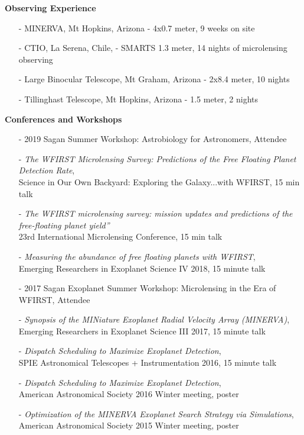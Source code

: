 \documentclass{article}
\begin{document}
{\large{\bf Observing Experience}}
\begin{itemize}
\item[-] MINERVA, Mt Hopkins, Arizona - 4x0.7 meter, 9 weeks on site
\item[-] CTIO, La Serena, Chile, - SMARTS 1.3 meter, 14 nights of microlensing observing
\item[-] Large Binocular Telescope, Mt Graham, Arizona - 2x8.4 meter, 10 nights
\item[-] Tillinghast Telescope, Mt Hopkins, Arizona - 1.5 meter, 2 nights 
\end{itemize}





{\large{\bf Conferences and Workshops}}
\begin{itemize}
\item[-] 2019 Sagan Summer Workshop: Astrobiology for Astronomers, Attendee
\item[-] \textit{ The WFIRST Microlensing Survey: Predictions of the Free Floating Planet Detection Rate},\\ Science in Our Own Backyard: Exploring the Galaxy...with WFIRST, 15 min talk
\item[-] \textit{The WFIRST microlensing survey: mission updates and predictions of the free-floating planet yield”}\\23rd International Microlensing Conference, 15 min talk
\item[-] \textit{Measuring the abundance of free floating planets with WFIRST},\\ Emerging Researchers in Exoplanet Science IV 2018, 15 minute talk
\item[-]  2017 Sagan Exoplanet Summer Workshop: Microlensing in the Era of WFIRST, Attendee 
\item[-] \textit{Synopsis of the MINiature Exoplanet Radial Velocity Array (MINERVA)},\\ Emerging Researchers in Exoplanet Science III 2017, 15 minute talk
\item[-] \textit{Dispatch Scheduling to Maximize Exoplanet Detection},\\ SPIE Astronomical Telescopes + Instrumentation 2016, 15 minute talk
\item[-] \textit{Dispatch Scheduling to Maximize Exoplanet Detection},\\ American Astronomical Society 2016 Winter meeting, poster
\item[-] \textit{Optimization of the MINERVA Exoplanet Search Strategy via Simulations},\\ American Astronomical Society 2015 Winter meeting, poster

\end{itemize}
\end{document}
